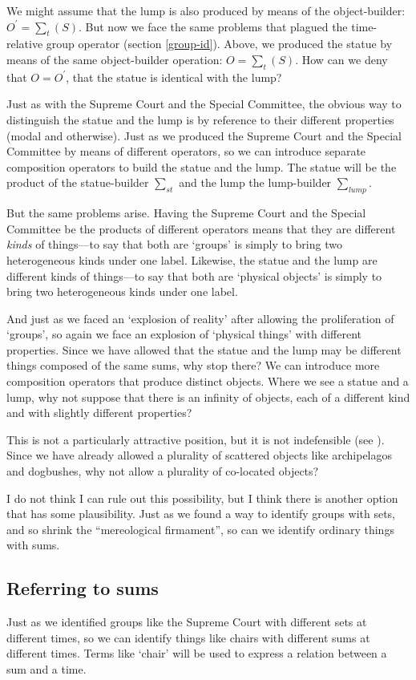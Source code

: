 \documentclass[11pt]{article}
\begin{document}
\begin{spacing}{1.5}
We might assume that the lump is also produced by means of the
object-builder: $O^{\prime} = \sum _{t} ( S )$.  But now we face the
same problems that plagued the time-relative group operator (section
\ref{group-id}).  Above, we produced the statue by means of the same
object-builder operation: $O = \sum _{t} ( S )$.  How can we deny that
$O = O^{\prime}$, that the statue is identical with the lump?

Just as with the Supreme Court and the Special Committee, the obvious
way to distinguish the statue and the lump is by reference to their
different properties (modal and otherwise).  Just as we produced the
Supreme Court and the Special Committee by means of different
operators, so we can introduce separate composition operators to build
the statue and the lump.  The statue will be the product of the
statue-builder $\sum _{st}$ and the lump the lump-builder $\sum
_{lump}$.

But the same problems arise.  Having the Supreme Court and the Special
Committee be the products of different operators means that they are
different {\em kinds} of things---to say that both are `groups' is
simply to bring two heterogeneous kinds under one label.  Likewise, the
statue and the lump are different kinds of things---to say that both
are `physical objects' is simply to bring two heterogeneous kinds
under one label.

And just as we faced an `explosion of reality' after allowing the
proliferation of `groups', so again we face an explosion of `physical
things' with different properties.  Since we have allowed that the
statue and the lump may be different things composed of the same sums,
why stop there?  We can introduce more composition operators that
produce distinct objects.  Where we see a statue and a lump, why not
suppose that there is an infinity of objects, each of a different kind
and with slightly different properties?

This is not a particularly attractive position, but it is not
indefensible (see \citet[section 4]{bennett2004}).  Since we have
already allowed a plurality of scattered objects like archipelagos and
dogbushes, why not allow a plurality of co-located objects?

I do not think I can rule out this possibility, but I think there is
another option that has some plausibility.  Just as we found a way to
identify groups with sets, and so shrink the ``mereological
firmament'', so can we identify ordinary things with sums.

\subsection{Referring to sums}
\label{chair-ref}
Just as we identified groups like the Supreme Court with different
sets at different times, so we can identify things like chairs with
different sums at different times.  Terms like `chair' will be used to
express a relation between a sum and a time.


\end{spacing}
\end{document}
